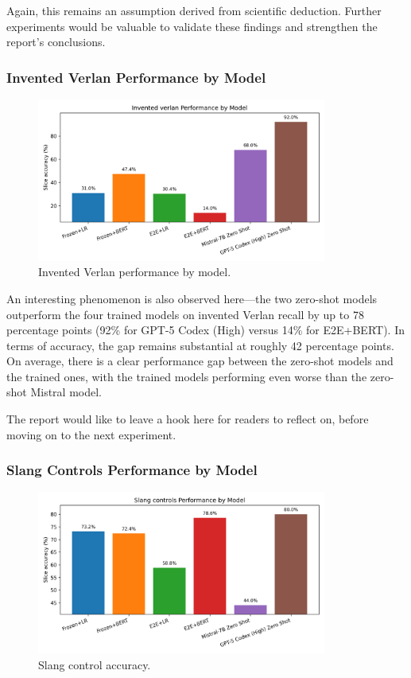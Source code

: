 \documentclass[12pt]{article}
\begin{document}
Again, this remains an assumption derived from scientific deduction. 
Further experiments would be valuable to validate these findings and strengthen the report's conclusions.

\subsubsection{Invented Verlan Performance by Model}

\begin{figure}[H]
    \centering
    \includegraphics[width=0.85\textwidth]{figures/invented_verlan_comparison.png}
    \caption{Invented Verlan performance by model.}
    \label{fig:invented-verlan-comparison}
\end{figure}

An interesting phenomenon is also observed here\;---\;the two zero-shot models outperform the four trained models on invented Verlan recall by up to 78 percentage points (92\% for GPT-5 Codex (High) versus 14\% for E2E+BERT). 
In terms of accuracy, the gap remains substantial at roughly 42 percentage points.
On average, there is a clear performance gap between the zero-shot models and the trained ones, with the trained models performing even worse than the zero-shot Mistral model.

The report would like to leave a hook here for readers to reflect on, before moving on to the next experiment.

\subsubsection{Slang Controls Performance by Model}

\begin{figure}[H]
    \centering
    \includegraphics[width=0.85\textwidth]{figures/slang_controls_comparison.png}
    \caption{Slang control accuracy.}
    \label{fig:slang-comparison}
\end{figure}
\end{document}
